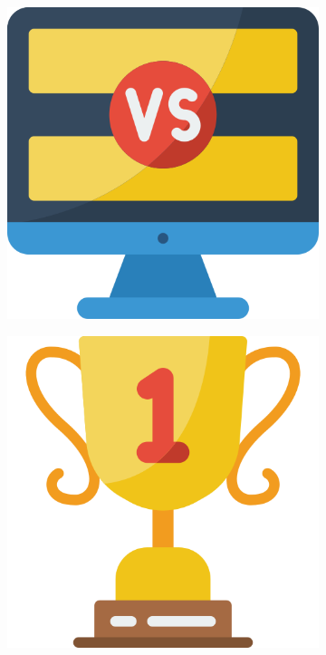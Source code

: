 \begin{figure}[h]
\begin{subfigure}{.1\textwidth}
        \includegraphics[width=.8\linewidth]{images/icons/014-computer.png}
    \end{subfigure}
    \begin{subfigure}{.1\textwidth}
        \centering
        \includegraphics[width=.8\linewidth]{images/icons/028-trophy.png}
    \end{subfigure}
    \begin{subfigure}{.1\textwidth}
        \centering

\end{subfigure}
\end{figure}

